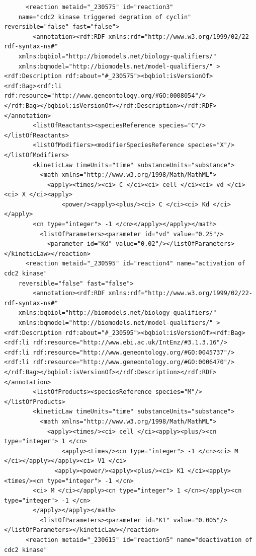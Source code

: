 \documentclass[a4paper,10pt,titlepage]{article}
\begin{document}
\begin{verbatim}
      <reaction metaid="_230575" id="reaction3" 
	name="cdc2 kinase triggered degration of cyclin" reversible="false" fast="false">
        <annotation><rdf:RDF xmlns:rdf="http://www.w3.org/1999/02/22-rdf-syntax-ns#" 
	xmlns:bqbiol="http://biomodels.net/biology-qualifiers/" 
	xmlns:bqmodel="http://biomodels.net/model-qualifiers/" >
<rdf:Description rdf:about="#_230575"><bqbiol:isVersionOf>
<rdf:Bag><rdf:li rdf:resource="http://www.geneontology.org/#GO:0008054"/>
</rdf:Bag></bqbiol:isVersionOf></rdf:Description></rdf:RDF></annotation>
        <listOfReactants><speciesReference species="C"/></listOfReactants>
        <listOfModifiers><modifierSpeciesReference species="X"/></listOfModifiers>
        <kineticLaw timeUnits="time" substanceUnits="substance">
          <math xmlns="http://www.w3.org/1998/Math/MathML">
            <apply><times/><ci> C </ci><ci> cell </ci><ci> vd </ci><ci> X </ci><apply>
                <power/><apply><plus/><ci> C </ci><ci> Kd </ci></apply>
		<cn type="integer"> -1 </cn></apply></apply></math>
          <listOfParameters><parameter id="vd" value="0.25"/>
            <parameter id="Kd" value="0.02"/></listOfParameters></kineticLaw></reaction>
      <reaction metaid="_230595" id="reaction4" name="activation of cdc2 kinase" 
	reversible="false" fast="false">
        <annotation><rdf:RDF xmlns:rdf="http://www.w3.org/1999/02/22-rdf-syntax-ns#" 
	xmlns:bqbiol="http://biomodels.net/biology-qualifiers/" 
	xmlns:bqmodel="http://biomodels.net/model-qualifiers/" >
<rdf:Description rdf:about="#_230595"><bqbiol:isVersionOf><rdf:Bag>
<rdf:li rdf:resource="http://www.ebi.ac.uk/IntEnz/#3.1.3.16"/>
<rdf:li rdf:resource="http://www.geneontology.org/#GO:0045737"/>
<rdf:li rdf:resource="http://www.geneontology.org/#GO:0006470"/>
</rdf:Bag></bqbiol:isVersionOf></rdf:Description></rdf:RDF></annotation>
        <listOfProducts><speciesReference species="M"/></listOfProducts>
        <kineticLaw timeUnits="time" substanceUnits="substance">
          <math xmlns="http://www.w3.org/1998/Math/MathML">
            <apply><times/><ci> cell </ci><apply><plus/><cn type="integer"> 1 </cn>
                <apply><times/><cn type="integer"> -1 </cn><ci> M </ci></apply></apply><ci> V1 </ci>
              <apply><power/><apply><plus/><ci> K1 </ci><apply><times/><cn type="integer"> -1 </cn>
		<ci> M </ci></apply><cn type="integer"> 1 </cn></apply><cn type="integer"> -1 </cn>
		</apply></apply></math>
          <listOfParameters><parameter id="K1" value="0.005"/></listOfParameters></kineticLaw></reaction>
      <reaction metaid="_230615" id="reaction5" name="deactivation of cdc2 kinase" 

\end{verbatim}
\end{document}
